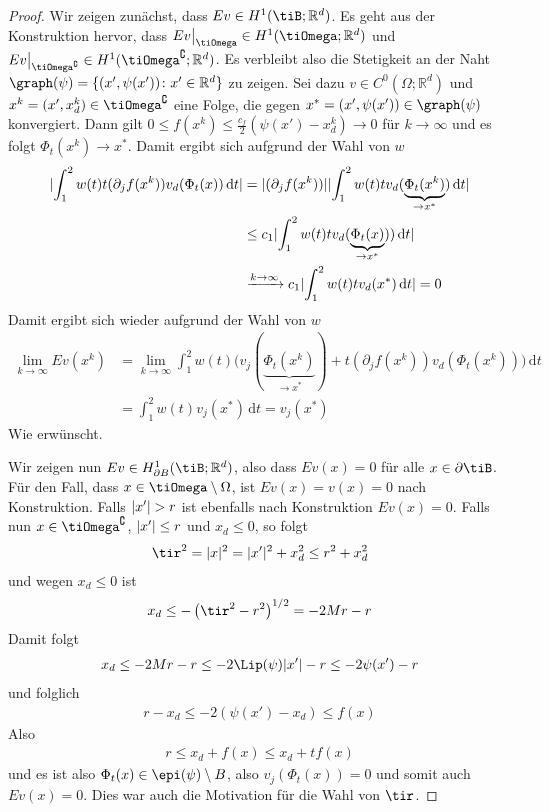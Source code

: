 \documentclass{scrartcl}
\def\R{\mathbb{R}}
\newcommand{\dif}[1]{\,\mathrm{d} #1}
\DeclarePairedDelimiter{\abs}{|}{|}
\begin{document}
\begin{proof}
	Wir zeigen zunächst, dass $Ev\in H^1(\tiB;\R^d)$. Es geht aus der Konstruktion hervor, dass $Ev\big\vert_{\tiOmega}\in H^1(\tiOmega;\R^d)$ und $Ev\big\vert_{\tiOmega^\complement}\in H^1(\tiOmega^\complement;\R^d)$. Es verbleibt also die Stetigkeit an der Naht $\graph(\psi)=\{(x',\psi(x'))\colon x'\in\R^d\}$ zu zeigen.
	Sei dazu $v\in C^0(\Omega;\R^d)$ und $x^k=(x',x_d^k)\in\tiOmega^\complement$ eine Folge, die gegen $x^*=(x',\psi(x'))\in \graph(\psi)$ konvergiert. Dann gilt $0\leq f(x^k)\leq\frac{c_f}{2}(\psi(x')-x_d^k)\to0$ für $k\to\infty$ und es folgt $\Phi_t(x^k)\to x^*$. Damit ergibt sich aufgrund der Wahl von $w$
	\begin{align*}
		\abs{\int_1^2w(t)t(\partial_jf(x^k))v_d(\Phi_t(x))\dif t}
		&=\abs{(\partial_jf(x^k))}\abs{\int_1^2w(t)tv_d(\underbrace{\Phi_t(x^k)}_{\to x^*})\dif t} \\
		&\leq c_1 \abs{\int_1^2w(t)tv_d(\underbrace{\Phi_t(x)}_{\to x^*}))\dif t} \\
		&\xrightarrow{k\to\infty}c_1 \abs{\int_1^2w(t)tv_d(x^*)\dif t}
		=0
	\end{align*}
	Damit ergibt sich wieder aufgrund der Wahl von $w$
	\begin{align*}
		\lim_{k\to\infty}Ev(x^k)&=\lim_{k\to\infty}\int_1^2w(t)\big(v_j(\underbrace{\Phi_t(x^k)}_{\to x^*})+t(\partial_jf(x^k))v_d(\Phi_t(x^k))\big)\dif t \\
		&=\int_1^2w(t)v_j(x^*)\dif t
		= v_j(x^*)
	\end{align*}
	Wie erwünscht.
	
	Wir zeigen nun $Ev\in H^1_{\partial B}(\tiB;\R^d)$, also dass $Ev(x)=0$ für alle $x\in\partial \tiB$.
	Für den Fall, dass $x\in\tiOmega\setminus\Omega$, ist $Ev(x) = v(x) = 0$ nach Konstruktion.
	Falls $\abs{x'}>r$ ist ebenfalls nach Konstruktion $Ev(x)=0$.
	Falls nun $x\in\tiOmega^\complement$, $\abs{x'}\leq r$ und $x_d\leq0$, so folgt
	\begin{align*}
		\tir^2 = \abs{x}^2 = \abs{x'}^2+x_d^2\leq r^2+x_d^2
	\end{align*}
	und wegen $x_d\leq0$ ist 
	\begin{align*}
		x_d\leq -\left(\tir^2-r^2\right)^{1/2}= -2Mr-r
	\end{align*}
	Damit folgt
	\begin{align*}
		x_d\leq -2Mr-r\leq -2\Lip(\psi)\abs{x'}-r\leq -2\psi(x')-r
	\end{align*}
	und folglich
	\begin{align*}
		r-x_d\leq -2(\psi(x')-x_d)\leq f(x)
	\end{align*}
	Also
	\begin{align*}
		r\leq x_d+f(x) \leq x_d+tf(x)
	\end{align*}
	und es ist also $\Phi_t(x)\in\epi(\psi)\setminus B$, also $v_j(\Phi_t(x))=0$ und somit auch $Ev(x) = 0$. Dies war auch die Motivation für die Wahl von $\tir$.
	

\end{proof}
\end{document}
